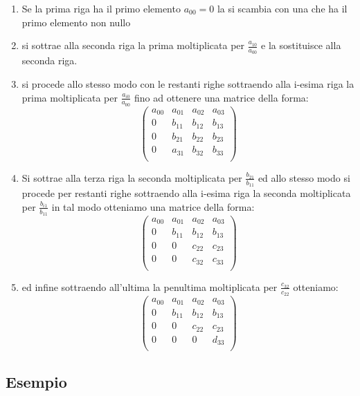 \documentclass[10pt,a4paper]{article}
\begin{document}
\begin{enumerate}
	\item Se la prima riga ha il primo elemento $ a_{0 0}=0 $  la si scambia con una che ha il primo elemento non nullo
	\item si sottrae alla seconda riga la prima moltiplicata per $ \frac{a_{10}}{a_{00}} $ e la sostituisce alla seconda riga.
	\item si procede allo stesso  modo  con le restanti righe  sottraendo alla i-esima riga la prima moltiplicata per $  \frac{a_{i0}}{a_{00}}$ fino ad ottenere una matrice della forma:
	\[\begin{pmatrix}
	a_{0 0}&a_{0 1}&a_{0 2}&a_{0 3}\\
	0&b_{1 1}&b_{1 2}&b_{1 3}\\
	0&b_{2 1}&b_{2 2}&b_{2 3}\\
	0&a_{3 1}&b_{3 2}&b_{3 3}\\
	\end{pmatrix}\]
	\item Si sottrae alla terza riga la seconda moltiplicata per $ \frac{b_{21}}{b_{11}} $  ed allo stesso modo si procede per restanti righe sottraendo alla i-esima riga la seconda moltiplicata per $ \frac{b_{i1}}{b_{11}} $  in tal modo otteniamo una matrice della forma:
	\[\begin{pmatrix}
	a_{0 0}&a_{0 1}&a_{0 2}&a_{0 3}\\
	0&b_{1 1}&b_{1 2}&b_{1 3}\\
	0&0&c_{2 2}&c_{2 3}\\
	0&0&c_{3 2}&c_{3 3}\\
	\end{pmatrix}\]
	\item ed infine sottraendo all'ultima la penultima moltiplicata per $ \frac{c_{32}}{c_{22}} $ otteniamo:
	\[\begin{pmatrix}
	a_{0 0}&a_{0 1}&a_{0 2}&a_{0 3}\\
	0&b_{1 1}&b_{1 2}&b_{1 3}\\
	0&0&c_{2 2}&c_{2 3}\\
	0&0&0&d_{3 3}\\
	\end{pmatrix}\]	
	
\end{enumerate}
\subsection{Esempio}
\end{document}
